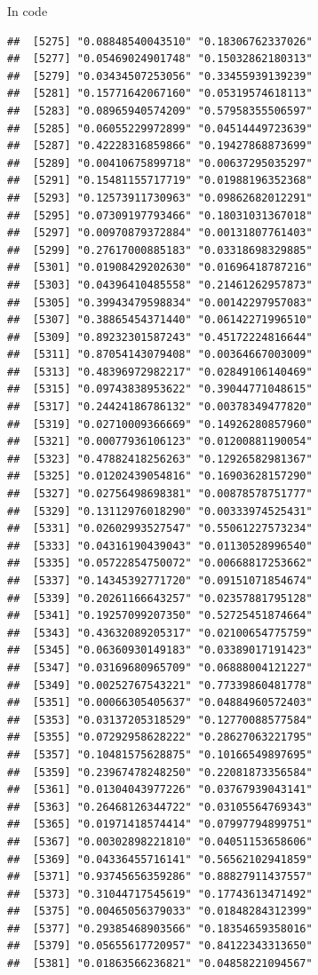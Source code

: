 \documentclass[ignorenonframetext,]{beamer}
\begin{document}
\begin{frame}[fragile]{In code}
\begin{verbatim}
##  [5275] "0.08848540043510" "0.18306762337026"
##  [5277] "0.05469024901748" "0.15032862180313"
##  [5279] "0.03434507253056" "0.33455939139239"
##  [5281] "0.15771642067160" "0.05319574618113"
##  [5283] "0.08965940574209" "0.57958355506597"
##  [5285] "0.06055229972899" "0.04514449723639"
##  [5287] "0.42228316859866" "0.19427868873699"
##  [5289] "0.00410675899718" "0.00637295035297"
##  [5291] "0.15481155717719" "0.01988196352368"
##  [5293] "0.12573911730963" "0.09862682012291"
##  [5295] "0.07309197793466" "0.18031031367018"
##  [5297] "0.00970879372884" "0.00131807761403"
##  [5299] "0.27617000885183" "0.03318698329885"
##  [5301] "0.01908429202630" "0.01696418787216"
##  [5303] "0.04396410485558" "0.21461262957873"
##  [5305] "0.39943479598834" "0.00142297957083"
##  [5307] "0.38865454371440" "0.06142271996510"
##  [5309] "0.89232301587243" "0.45172224816644"
##  [5311] "0.87054143079408" "0.00364667003009"
##  [5313] "0.48396972982217" "0.02849106140469"
##  [5315] "0.09743838953622" "0.39044771048615"
##  [5317] "0.24424186786132" "0.00378349477820"
##  [5319] "0.02710009366669" "0.14926280857960"
##  [5321] "0.00077936106123" "0.01200881190054"
##  [5323] "0.47882418256263" "0.12926582981367"
##  [5325] "0.01202439054816" "0.16903628157290"
##  [5327] "0.02756498698381" "0.00878578751777"
##  [5329] "0.13112976018290" "0.00333974525431"
##  [5331] "0.02602993527547" "0.55061227573234"
##  [5333] "0.04316190439043" "0.01130528996540"
##  [5335] "0.05722854750072" "0.00668817253662"
##  [5337] "0.14345392771720" "0.09151071854674"
##  [5339] "0.20261166643257" "0.02357881795128"
##  [5341] "0.19257099207350" "0.52725451874664"
##  [5343] "0.43632089205317" "0.02100654775759"
##  [5345] "0.06360930149183" "0.03389017191423"
##  [5347] "0.03169680965709" "0.06888004121227"
##  [5349] "0.00252767543221" "0.77339860481778"
##  [5351] "0.00066305405637" "0.04884960572403"
##  [5353] "0.03137205318529" "0.12770088577584"
##  [5355] "0.07292958628222" "0.28627063221795"
##  [5357] "0.10481575628875" "0.10166549897695"
##  [5359] "0.23967478248250" "0.22081873356584"
##  [5361] "0.01304043977226" "0.03767939043141"
##  [5363] "0.26468126344722" "0.03105564769343"
##  [5365] "0.01971418574414" "0.07997794899751"
##  [5367] "0.00302898221810" "0.04051153658606"
##  [5369] "0.04336455716141" "0.56562102941859"
##  [5371] "0.93745656359286" "0.88827911437557"
##  [5373] "0.31044717545619" "0.17743613471492"
##  [5375] "0.00465056379033" "0.01848284312399"
##  [5377] "0.29385468903566" "0.18354659358016"
##  [5379] "0.05655617720957" "0.84122343313650"
##  [5381] "0.01863566236821" "0.04858221094567"

\end{verbatim}
\end{frame}
\end{document}

